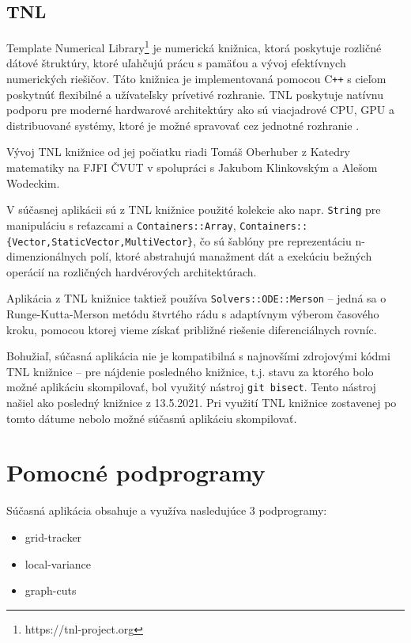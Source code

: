 \subsection {TNL}\label{tnl}
Template Numerical Library\footnote{https://tnl-project.org} je numerická knižnica, ktorá poskytuje rozličné dátové štruktúry, ktoré uľahčujú prácu s pamäťou a vývoj efektívnych numerických riešičov. Táto knižnica je implementovaná pomocou C\texttt{++} s cieľom poskytnúť flexibilné a užívateľsky prívetivé rozhranie. TNL poskytuje natívnu podporu pre moderné hardwarové architektúry ako sú viacjadrové CPU, GPU a distribuované systémy, ktoré je možné spravovať cez jednotné rozhranie \cite{tnl_description}.

Vývoj TNL knižnice od jej počiatku riadi Tomáš Oberhuber z Katedry matematiky na FJFI ČVUT v spolupráci s Jakubom Klinkovským a Alešom Wodeckim.

V súčasnej aplikácii sú z TNL knižnice použité kolekcie ako napr. \texttt{String} pre manipuláciu s reťazcami a \texttt{Containers::Array}, \texttt{Containers::\{Vector,StaticVector,MultiVector\}}, čo sú šablóny pre reprezentáciu n-dimenzionálnych polí, ktoré abstrahujú manažment dát a exekúciu bežných operácií na rozličných hardvérových architektúrach.

Aplikácia z TNL knižnice taktiež používa \texttt{Solvers::ODE::Merson} -- jedná sa o Runge-Kutta-Merson metódu štvrtého rádu s adaptívnym výberom časového kroku, pomocou ktorej vieme získať približné riešenie diferenciálnych rovníc.

Bohužiaľ, súčasná aplikácia nie je kompatibilná s najnovšími zdrojovými kódmi TNL knižnice -- pre nájdenie posledného  knižnice, t.j. stavu za ktorého bolo možné aplikáciu skompilovať, bol využitý nástroj \texttt{git bisect}. Tento nástroj našiel ako posledný  knižnice z 13.5.2021. Pri využití TNL knižnice zostavenej po tomto dátume nebolo možné súčasnú aplikáciu skompilovať.

\section {Pomocné podprogramy}\label{helper_apps}
Súčasná aplikácia obsahuje a využíva nasledujúce 3 podprogramy:

\begin {itemize}
\item {grid-tracker}
\item {local-variance}
\item {graph-cuts}
\end {itemize}

